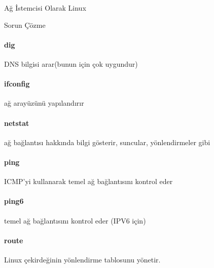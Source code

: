 \begin{section}{Ağ İstemcisi Olarak Linux}
\begin{subsection}{Sorun Çözme}
{\paragraph{dig}{DNS bilgisi arar(bunun için çok uygundur)}
\paragraph{ifconfig}{ağ arayüzünü yapılandırır}
\paragraph{netstat}{ağ bağlantısı hakkında bilgi gösterir, suncular, yönlendirmeler gibi}
\paragraph{ping}{ICMP'yi kullanarak temel ağ bağlantısını kontrol eder}
\paragraph{ping6}{temel ağ bağlantısını kontrol eder (IPV6 için)}
\paragraph{route}{Linux çekirdeğinin yönlendirme tablosunu yönetir.}
}


\end{subsection}
\end{section}
